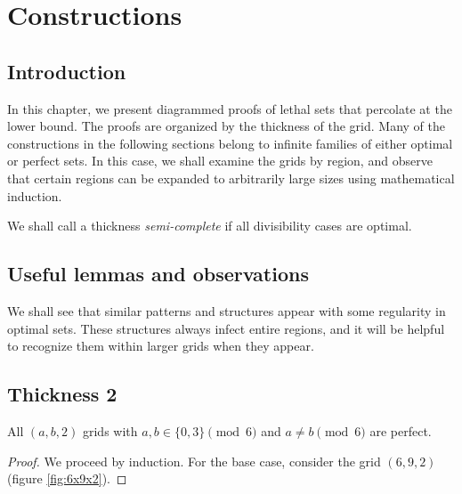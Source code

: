 \chapter{Constructions}

\section{Introduction}

In this chapter, we present diagrammed proofs of lethal sets that percolate at the lower bound. The proofs are organized by the thickness of the grid. Many of the constructions in the following sections belong to infinite families of either optimal or perfect sets. In this case, we shall examine the grids by region, and observe that certain regions can be expanded to arbitrarily large sizes using mathematical induction. 

We shall call a thickness \emph{semi-complete} if all divisibility cases are optimal.

\section{Useful lemmas and observations}

We shall see that similar patterns and structures appear with some regularity in optimal sets. These structures always infect entire regions, and it will be helpful to recognize them within larger grids when they appear. 

\section{Thickness 2}

\begin{con}
All $(a,b,2)$ grids with $a,b \in \{0,3\} \pmod 6$ and $a \neq b \pmod 6$ are perfect. 
\end{con}

\begin{proof}
We proceed by induction. For the base case, consider the grid $(6,9,2)$ (figure \ref{fig:6x9x2}).
\end{proof}

